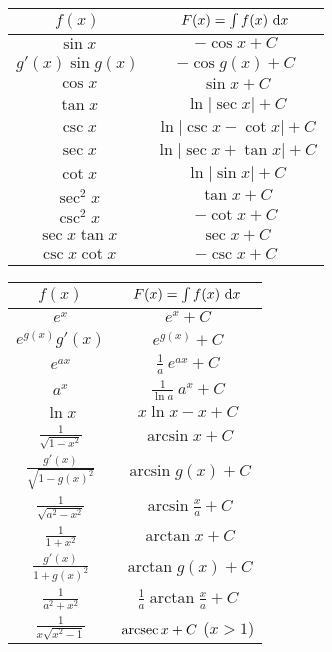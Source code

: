 \begin{center}
     \begin{tabular}{|c|c|}
        \hline
    $f(x)$ & $ F(x)=\int f(x)\ \mathrm{d}x$ \\ 
        \hline\hline
$\sin x$ & $-\cos x+C$ \\  \hline
$g'(x)\sin g(x)$ & $-\cos g(x)+C$ \\  \hline
$\cos x$ & $\sin x+C$ \\  \hline
$\tan x$ & $\ln|\sec x|+C$ \\  \hline
$\csc x$ & $\ln |\csc x-\cot x|+C$ \\  \hline
$\sec x$ & $\ln |\sec x+\tan x|+C$ \\  \hline
$\cot x$ & $\ln|\sin x|+C$ \\  \hline
$\sec^2 x$ & $\tan x+C$ \\  \hline
$\csc^2 x$ & $-\cot x+C$ \\  \hline
$\sec x\tan x$ & $\sec x+C$ \\  \hline
$\csc x\cot x$ & $-\csc x+C$ \\  \hline\hline
     \end{tabular}\qquad\qquad
     \begin{tabular}{|c|c|}
        \hline
    $f(x)$ & $ F(x)=\int f(x)\ \mathrm{d}x$ \\ 
        \hline\hline
$e^x$ & $e^x+C$ \\  \hline
$e^{g(x)}g'(x)$ & $e^{g(x)}+C$ \\  \hline
$e^{ax}$ & $\frac{1}{a}\ e^{ax}+C$ \\  \hline
$a^x$ & $\frac{1}{\ln a}\ a^x+C$ \\  \hline\hline
$\ln x$ & $x\ln x -x+C$ \\  \hline\hline
$\frac{1}{\sqrt{1-x^2}}$ & $\arcsin x+C$ \\  \hline
$\frac{g'(x)}{\sqrt{1-g(x)^2}}$ & $\arcsin g(x)+C$ \\  \hline
$\frac{1}{\sqrt{a^2-x^2}}$ & $\arcsin \frac{x}{a}+C$ \\  \hline
$\frac{1}{1+x^2}$ & $\arctan x+C$ \\  \hline
$\frac{g'(x)}{1+g(x)^2}$ & $\arctan g(x)+C$ \\  \hline
$\frac{1}{a^2+x^2}$ & $\frac{1}{a}\arctan \frac{x}{a}+C$ \\  \hline
$\frac{1}{x\sqrt{x^2-1}}$ & $\mathop{\mathrm{arcsec}} x+C$ \quad($x>1$)\\  \hline
     \end{tabular}
\renewcommand{\arraystretch}{1.0}

\end{center}



